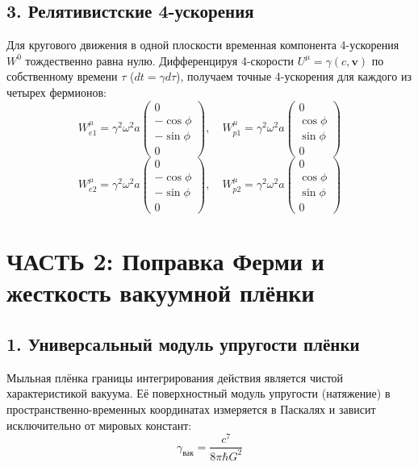 \documentclass[12pt,a4paper]{article}
\begin{document}
\subsection*{3. Релятивистские 4-ускорения}

Для кругового движения в одной плоскости временная компонента 4-ускорения $W^0$ тождественно равна нулю. Дифференцируя 4-скорости $U^\mu = \gamma(c, \mathbf{v})$ по собственному времени $\tau$ ($dt = \gamma d\tau$), получаем точные 4-ускорения для каждого из четырех фермионов:
\begin{equation}
W_{e1}^\mu = \gamma^2 \omega^2 a \begin{pmatrix} 0 \\ -\cos\phi \\ -\sin\phi \\ 0 \end{pmatrix}, \quad 
W_{p1}^\mu = \gamma^2 \omega^2 a \begin{pmatrix} 0 \\ \cos\phi \\ \sin\phi \\ 0 \end{pmatrix}
\end{equation}
\begin{equation}
W_{e2}^\mu = \gamma^2 \omega^2 a \begin{pmatrix} 0 \\ -\cos\phi \\ -\sin\phi \\ 0 \end{pmatrix}, \quad 
W_{p2}^\mu = \gamma^2 \omega^2 a \begin{pmatrix} 0 \\ \cos\phi \\ \sin\phi \\ 0 \end{pmatrix}
\end{equation}

\section*{ЧАСТЬ 2: Поправка Ферми и жесткость вакуумной плёнки}

\subsection*{1. Универсальный модуль упругости плёнки}

Мыльная плёнка границы интегрирования действия является чистой характеристикой вакуума. Её поверхностный модуль упругости (натяжение) в пространственно-временных координатах измеряется в Паскалях и зависит исключительно от мировых констант:
\begin{equation}
\gamma_{вак} = \frac{c^7}{8\pi \hbar G^2}
\end{equation}
\end{document}
